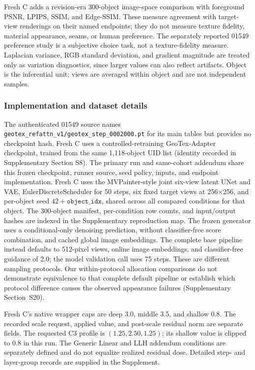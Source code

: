 \documentclass[times,twocolumn,final]{elsarticle}
\begin{document}
Fresh C adds a revision-era 300-object image-space comparison with foreground PSNR, LPIPS, SSIM, and Edge-SSIM. These measure agreement with target-view renderings on their named endpoints; they do not measure texture fidelity, material appearance, seams, or human preference. The separately reported 01549 preference study is a subjective choice task, not a texture-fidelity measure. Laplacian variance, RGB standard deviation, and gradient magnitude are treated only as variation diagnostics, since larger values can also reflect artifacts. Object is the inferential unit; views are averaged within object and are not independent samples.

\subsubsection{Implementation and dataset details}

The authenticated 01549 source names \texttt{geotex\_refattn\_v1/geotex\_step\_0002000.pt} for its main tables but provides no checkpoint hash. Fresh C uses a controlled-retraining GeoTex-Adapter checkpoint, trained from the same 1,118-object UID list (identity recorded in Supplementary Section S8). The primary run and same-cohort addendum share this frozen checkpoint, runner source, seed policy, inputs, and endpoint implementation. Fresh C uses the MVPainter-style joint six-view latent UNet and VAE, EulerDiscreteScheduler for 50 steps, six fixed target views at 256$\times$256, and per-object seed $42+\texttt{object\_idx}$, shared across all compared conditions for that object. The 300-object manifest, per-condition row counts, and input/output hashes are indexed in the Supplementary reproduction map. The frozen generator uses a conditional-only denoising prediction, without classifier-free score combination, and cached global image embeddings. The complete base pipeline instead defaults to 512-pixel views, online image embeddings, and classifier-free guidance of 2.0; the model validation call uses 75 steps. These are different sampling protocols. Our within-protocol allocation comparisons do not demonstrate equivalence to that complete default pipeline or establish which protocol difference causes the observed appearance failures (Supplementary Section~S20).

Fresh C's native wrapper caps are deep 3.0, middle 3.5, and shallow 0.8. The recorded scale request, applied value, and post-scale residual norm are separate fields. The requested C3 profile is $(1.25,2.50,1.25)$; its shallow value is clipped to 0.8 in this run. The Generic Linear and LLH addendum conditions are separately defined and do not equalize realized residual dose. Detailed step- and layer-group records are supplied in the Supplement.
\end{document}
